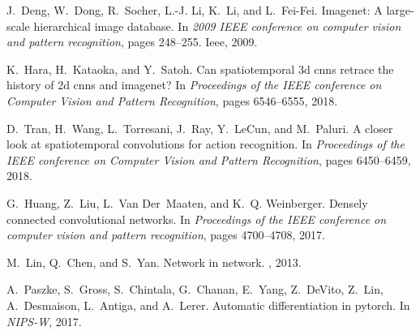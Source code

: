 \documentclass[10pt,twocolumn,letterpaper]{article}
\begin{document}
{\begin{thebibliography}{10}
J.~Deng, W.~Dong, R.~Socher, L.-J. Li, K.~Li, and L.~Fei-Fei.
\newblock Imagenet: A large-scale hierarchical image database.
\newblock In {\em 2009 IEEE conference on computer vision and pattern
	recognition}, pages 248--255. Ieee, 2009.

K.~Hara, H.~Kataoka, and Y.~Satoh.
\newblock Can spatiotemporal 3d cnns retrace the history of 2d cnns and
	imagenet?
\newblock In {\em Proceedings of the IEEE conference on Computer Vision and
	Pattern Recognition}, pages 6546--6555, 2018.

D.~Tran, H.~Wang, L.~Torresani, J.~Ray, Y.~LeCun, and M.~Paluri.
\newblock A closer look at spatiotemporal convolutions for action recognition.
\newblock In {\em Proceedings of the IEEE conference on Computer Vision and
	Pattern Recognition}, pages 6450--6459, 2018.

G.~Huang, Z.~Liu, L.~Van Der~Maaten, and K.~Q. Weinberger.
\newblock Densely connected convolutional networks.
\newblock In {\em Proceedings of the IEEE conference on computer vision and
	pattern recognition}, pages 4700--4708, 2017.

M.~Lin, Q.~Chen, and S.~Yan.
\newblock Network in network.
, 2013.

A.~Paszke, S.~Gross, S.~Chintala, G.~Chanan, E.~Yang, Z.~DeVito, Z.~Lin,
	A.~Desmaison, L.~Antiga, and A.~Lerer.
\newblock Automatic differentiation in pytorch.
\newblock In {\em NIPS-W}, 2017.

\end{thebibliography}
}
\end{document}
